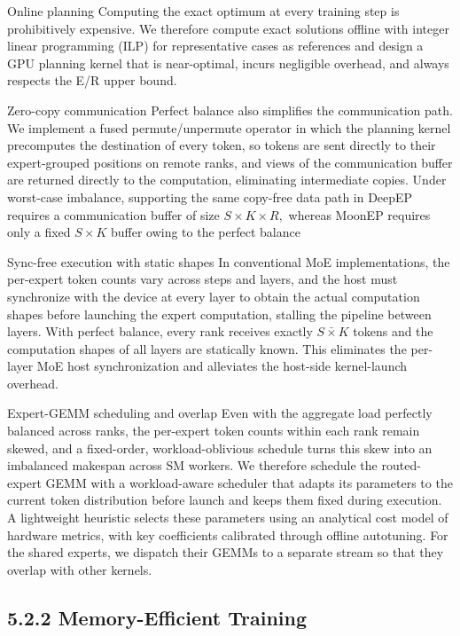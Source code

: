 \documentclass[
  10
]{article}
\begin{document}
Online planning Computing the exact optimum at every training step is
prohibitively expensive. We therefore compute exact solutions offline
with integer linear programming (ILP) for representative cases as
references and design a GPU planning kernel that is near-optimal, incurs
negligible overhead, and always respects the E/R upper bound.

Zero-copy communication Perfect balance also simplifies the
communication path. We implement a fused permute/unpermute operator in
which the planning kernel precomputes the destination of every token, so
tokens are sent directly to their expert-grouped positions on remote
ranks, and views of the communication buffer are returned directly to
the computation, eliminating intermediate copies. Under worst-case
imbalance, supporting the same copy-free data path in DeepEP requires a
communication buffer of size \(S \times K \times R ,\) whereas MoonEP
requires only a fixed \(S \times K\) buffer owing to the perfect balance

Sync-free execution with static shapes In conventional MoE
implementations, the per-expert token counts vary across steps and
layers, and the host must synchronize with the device at every layer to
obtain the actual computation shapes before launching the expert
computation, stalling the pipeline between layers. With perfect balance,
every rank receives exactly \(S \bar { \times } K\) tokens and the
computation shapes of all layers are statically known. This eliminates
the per-layer MoE host synchronization and alleviates the host-side
kernel-launch overhead.

Expert-GEMM scheduling and overlap Even with the aggregate load
perfectly balanced across ranks, the per-expert token counts within each
rank remain skewed, and a fixed-order, workload-oblivious schedule turns
this skew into an imbalanced makespan across SM workers. We therefore
schedule the routed-expert GEMM with a workload-aware scheduler that
adapts its parameters to the current token distribution before launch
and keeps them fixed during execution. A lightweight heuristic selects
these parameters using an analytical cost model of hardware metrics,
with key coefficients calibrated through offline autotuning. For the
shared experts, we dispatch their GEMMs to a separate stream so that
they overlap with other kernels.

\subsection{5.2.2 Memory-Efficient
Training}\label{memory-efficient-training}
\end{document}
